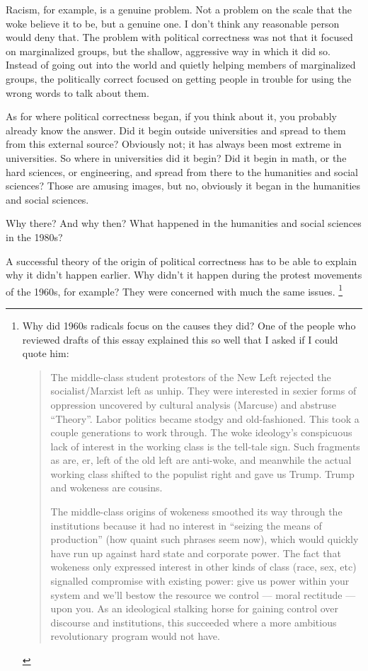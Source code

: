 Racism, for example, is a genuine problem. Not a problem on the scale
that the woke believe it to be, but a genuine one. I don't think any
reasonable person would deny that. The problem with political
correctness was not that it focused on marginalized groups, but the
shallow, aggressive way in which it did so. Instead of going out into
the world and quietly helping members of marginalized groups, the
politically correct focused on getting people in trouble for using the
wrong words to talk about them.

As for where political correctness began, if you think about it, you
probably already know the answer. Did it begin outside universities and
spread to them from this external source? Obviously not; it has always
been most extreme in universities. So where in universities did it
begin? Did it begin in math, or the hard sciences, or engineering, and
spread from there to the humanities and social sciences? Those are
amusing images, but no, obviously it began in the humanities and social
sciences.

Why there? And why then? What happened in the humanities and social
sciences in the 1980s?

A successful theory of the origin of political correctness has to be
able to explain why it didn't happen earlier. Why didn't it happen
during the protest movements of the 1960s, for example? They were
concerned with much the same issues. \footnote{Why did 1960s radicals focus on the causes they did? One of the
people who reviewed drafts of this essay explained this so well that I
asked if I could quote him:

\begin{quote}
The middle-class student protestors of the New Left rejected the
socialist/Marxist left as unhip. They were interested in sexier forms of
oppression uncovered by cultural analysis (Marcuse) and abstruse
``Theory''. Labor politics became stodgy and old-fashioned. This took a
couple generations to work through. The woke ideology's conspicuous lack
of interest in the working class is the tell-tale sign. Such fragments
as are, er, left of the old left are anti-woke, and meanwhile the actual
working class shifted to the populist right and gave us Trump. Trump and
wokeness are cousins.

The middle-class origins of wokeness smoothed its way through the
institutions because it had no interest in ``seizing the means of
production'' (how quaint such phrases seem now), which would quickly
have run up against hard state and corporate power. The fact that
wokeness only expressed interest in other kinds of class (race, sex,
etc) signalled compromise with existing power: give us power within your
system and we'll bestow the resource we control --- moral rectitude ---
upon you. As an ideological stalking horse for gaining control over
discourse and institutions, this succeeded where a more ambitious
revolutionary program would not have.
\end{quote}}

